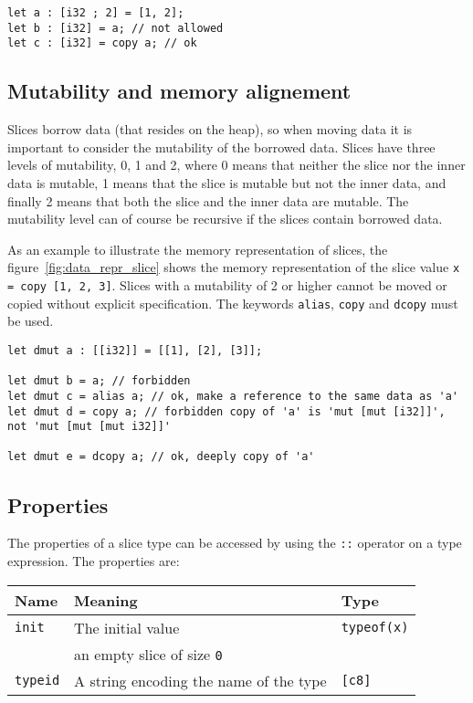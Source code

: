 \begin{lstlisting}[style=coloredverbatim]
let a : [i32 ; 2] = [1, 2];
let b : [i32] = a; // not allowed
let c : [i32] = copy a; // ok
\end{lstlisting}



\subsection{Mutability and memory alignement}

Slices borrow data (that resides on the heap), so when moving data it is
important to consider the mutability of the borrowed data. Slices have three
levels of mutability, 0, 1 and 2, where 0 means that neither the slice nor the
inner data is mutable, 1 means that the slice is mutable but not the inner data,
and finally 2 means that both the slice and the inner data are mutable. The
mutability level can of course be recursive if the slices contain borrowed data.


As an example to illustrate the memory representation of slices, the
figure~\ref{fig:data_repr_slice} shows the memory representation of the slice
value \texttt{x = copy [1, 2, 3]}. Slices with a mutability of 2 or higher
cannot be moved or copied without explicit specification. The keywords
\texttt{alias}, \texttt{copy} and \texttt{dcopy} must be used.

\begin{lstlisting}[style=coloredverbatim]
let dmut a : [[i32]] = [[1], [2], [3]];

let dmut b = a; // forbidden
let dmut c = alias a; // ok, make a reference to the same data as 'a'
let dmut d = copy a; // forbidden copy of 'a' is 'mut [mut [i32]]', not 'mut [mut [mut i32]]'

let dmut e = dcopy a; // ok, deeply copy of 'a'
\end{lstlisting}



\subsection{Properties}

The properties of a slice type can be accessed by using the \texttt{::} operator on a type expression. The properties are:

\begin{center}\begin{adjustbox}{max width=\linewidth}
  \begin{tabular}{|l|ll|}
    \hline
    Name & Meaning & Type\\
    \hline
    \hline
    \texttt{init} & The initial value & \texttt{typeof(x)}\\
    & an empty slice of size \texttt{0} & \\
    \hline
    \texttt{typeid} & A string encoding the name of the type & \texttt{[c8]} \\
    \hline
  \end{tabular}
\end{adjustbox}\end{center}

